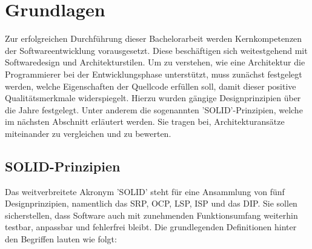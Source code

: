

\chapter{Grundlagen}

Zur erfolgreichen Durchführung dieser Bachelorarbeit werden Kernkompetenzen der Softwareentwicklung vorausgesetzt. Diese beschäftigen sich weitestgehend mit Softwaredesign und Architekturstilen. Um zu verstehen, wie eine Architektur die Programmierer bei der Entwicklungsphase unterstützt, muss zunächst festgelegt werden, welche Eigenschaften der Quellcode erfüllen soll, damit dieser positive Qualitätsmerkmale widerspiegelt. Hierzu wurden gängige Designprinzipien über die Jahre festgelegt. Unter anderem die sogenannten 'SOLID'-Prinzipien, welche im nächsten Abschnitt erläutert werden. Sie tragen bei, Architekturansätze miteinander zu vergleichen und zu bewerten.

\section{SOLID-Prinzipien}

Das weitverbreitete Akronym 'SOLID' steht für eine Ansammlung von fünf Designprinzipien, namentlich das \acrfull{SRP}, \acrfull{OCP}, \acrfull{LSP}, \acrfull{ISP} und das \acrfull{DIP}. Sie sollen sicherstellen, dass Software auch mit zunehmenden Funktionsumfang weiterhin testbar, anpassbar und fehlerfrei bleibt. Die grundlegenden Definitionen hinter den Begriffen lauten wie folgt:

